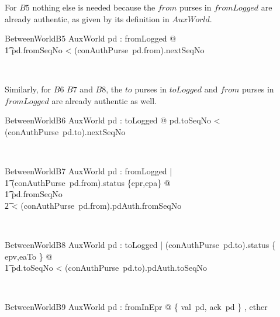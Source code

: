 For $B5$ nothing else is needed because the $from$ purses in $fromLogged$ are already authentic,
as given by its definition in $AuxWorld$.
%
\begin{LNewSDef}
\begin{schema}{BetweenWorldB5}
   AuxWorld
\where
    \forall pd : fromLogged @
  \\ %
  \t1 pd.fromSeqNo < (conAuthPurse~pd.from).nextSeqNo
\end{schema}~\end{LNewSDef}

Similarly, for $B6$ $B7$ and $B8$, the $to$ purses in $toLogged$ and $from$ purses in $fromLogged$
are already authentic as well.
%
\begin{LNewSDef}
\begin{schema}{BetweenWorldB6}
   AuxWorld
\where
   \forall pd : toLogged @ pd.toSeqNo < (conAuthPurse~pd.to).nextSeqNo
\end{schema}~\end{LNewSDef}

\begin{LNewSDef}
\begin{schema}{BetweenWorldB7}
   AuxWorld
\where
\forall pd : fromLogged |
  \\ %
  \t1 (conAuthPurse~pd.from).status \in \{epr,epa\} @
  \\ %
  \t1 pd.fromSeqNo
  \\ %
  \t2 < (conAuthPurse~pd.from).pdAuth.fromSeqNo
\end{schema}~\end{LNewSDef}

\begin{LNewSDef}
\begin{schema}{BetweenWorldB8}
   AuxWorld
\where
\forall pd : toLogged | (conAuthPurse~pd.to).status \in \{
  epv,eaTo \} @
  \\ %
  \t1 pd.toSeqNo < (conAuthPurse~pd.to).pdAuth.toSeqNo
\end{schema}~\end{LNewSDef}

\begin{LNewSDef}
\begin{schema}{BetweenWorldB9}
   AuxWorld
\where
\forall pd : fromInEpr @ \disjoint \langle \{ val~pd, ack~pd \} ,
  ether \rangle
\end{schema}~\end{LNewSDef}

